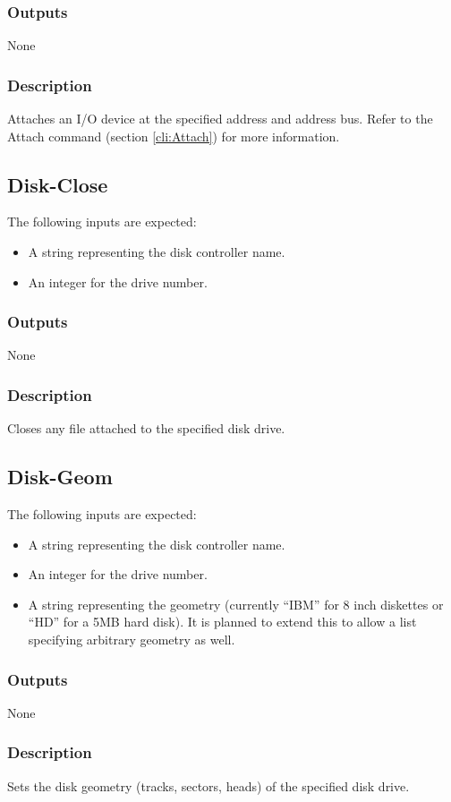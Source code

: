 \documentclass[10pt, openany]{book}
\begin{document}
\subsubsection{Outputs}
None
\subsubsection{Description}
Attaches an I/O device at the specified address and address bus.  Refer to the Attach command (section \ref{cli:Attach}) for more information.

\subsection{Disk-Close}
The following inputs are expected:
\begin{itemize}
  \item A string representing the disk controller name.
  \item An integer for the drive number.
\end{itemize}
\subsubsection{Outputs}
None
\subsubsection{Description}
Closes any file attached to the specified disk drive.

\subsection{Disk-Geom}
The following inputs are expected:
\begin{itemize}
  \item A string representing the disk controller name.
  \item An integer for the drive number.
  \item A string representing the geometry (currently ``IBM'' for 8 inch diskettes or ``HD'' for a 5MB hard disk).  It is planned to extend this to allow a list specifying arbitrary geometry as well.
\end{itemize}
\subsubsection{Outputs}
None
\subsubsection{Description}
Sets the disk geometry (tracks, sectors, heads) of the specified disk drive.
\end{document}
